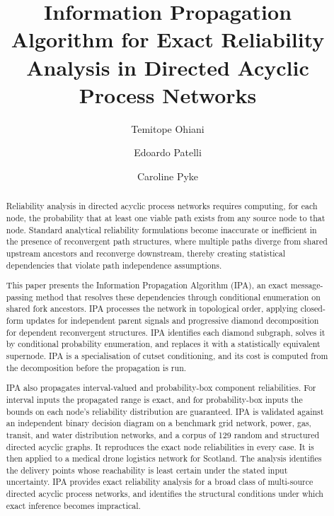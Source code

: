\documentclass[preprint,12pt]{elsarticle}
\begin{document}
\linenumbers

\begin{frontmatter}


\title{Information Propagation Algorithm for Exact Reliability Analysis in Directed Acyclic Process Networks}

\author[strathclyde]{Temitope Ohiani}
\author[strathclyde]{Edoardo Patelli} 
\author[nnl]{Caroline Pyke}





\begin{abstract}
Reliability analysis in directed acyclic process networks requires computing, for each node, the probability that at least one viable path exists from any source node to that node. Standard analytical reliability formulations become inaccurate or inefficient in the presence of reconvergent path structures, where multiple paths diverge from shared upstream ancestors and reconverge downstream, thereby creating statistical dependencies that violate path independence assumptions.

This paper presents the Information Propagation Algorithm (IPA), an exact message-passing method that resolves these dependencies through conditional enumeration on shared fork ancestors. IPA processes the network in topological order, applying closed-form updates for independent parent signals and progressive diamond decomposition for dependent reconvergent structures. IPA identifies each diamond subgraph, solves it by conditional probability enumeration, and replaces it with a statistically equivalent supernode. IPA is a specialisation of cutset conditioning, and its cost is computed from the decomposition before the propagation is run.

IPA also propagates interval-valued and probability-box component reliabilities. For interval inputs the propagated range is exact, and for probability-box inputs the bounds on each node's reliability distribution are guaranteed. IPA is validated against an independent binary decision diagram on a benchmark grid network, power, gas, transit, and water distribution networks, and a corpus of 129 random and structured directed acyclic graphs. It reproduces the exact node reliabilities in every case. It is then applied to a medical drone logistics network for Scotland. The analysis identifies the delivery points whose reachability is least certain under the stated input uncertainty. IPA provides exact reliability analysis for a broad class of multi-source directed acyclic process networks, and identifies the structural conditions under which exact inference becomes impractical.
\end{abstract}


\end{frontmatter}
\end{document}
